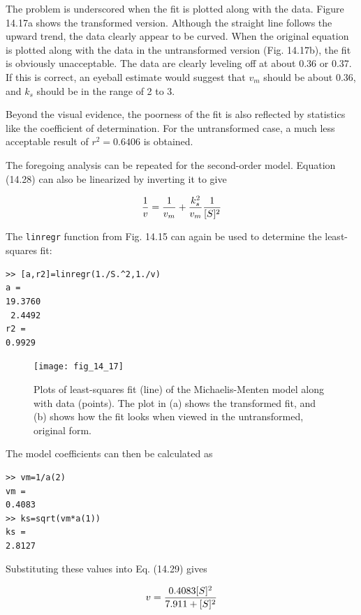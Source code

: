 \documentclass[../main.tex]{subfiles}
\begin{document}
The problem is underscored when the fit is plotted along with the data. Figure 14.17a shows the transformed version. Although the straight line follows the upward trend, the data clearly appear to be curved. When the original equation is plotted along with the data in the untransformed version (Fig. 14.17b), the fit is obviously unacceptable. The data are clearly leveling off at about 0.36 or 0.37. If this is correct, an eyeball estimate would suggest that $v_m$ should be about 0.36, and $k_s$ should be in the range of 2 to 3.

Beyond the visual evidence, the poorness of the fit is also reflected by statistics like the coefficient of determination. For the untransformed case, a much less acceptable result of $r^2 = 0.6406$ is obtained.


The foregoing analysis can be repeated for the second-order model. Equation (14.28) can also be linearized by inverting it to give

\begin{equation}
	\notag
	\frac{1}{v} = \frac{1}{v_m} + \frac{k^2_s}{v_m} \frac{1}{[S]^2}
\end{equation}

The \texttt{linregr} function from Fig. 14.15 can again be used to determine the least-squares fit:

\begin{lstlisting}[numbers=none] 
>> [a,r2]=linregr(1./S.^2,1./v)
a =
19.3760
 2.4492
r2 =
0.9929
\end{lstlisting}

\begin{figure}[H] 
	\centering
	\texttt{[image: fig\_14\_17]}
	\caption{\textsf{Plots of least-squares fit (line) of the Michaelis-Menten model along with data (points). The plot in (a) shows the transformed fit, and (b) shows how the fit looks when viewed in the untransformed, original form.}}
	\label{fig:fig_14_17}
\end{figure}

\noindent The model coefficients can then be calculated as

\begin{lstlisting}[numbers=none] 
>> vm=1/a(2)
vm =
0.4083
>> ks=sqrt(vm*a(1))
ks =
2.8127
\end{lstlisting}

\noindent Substituting these values into Eq. (14.29) gives

\begin{equation}
	\notag
	v = \frac{0.4083[S]^2}{7.911 + [S]^2}
\end{equation}
\end{document}
